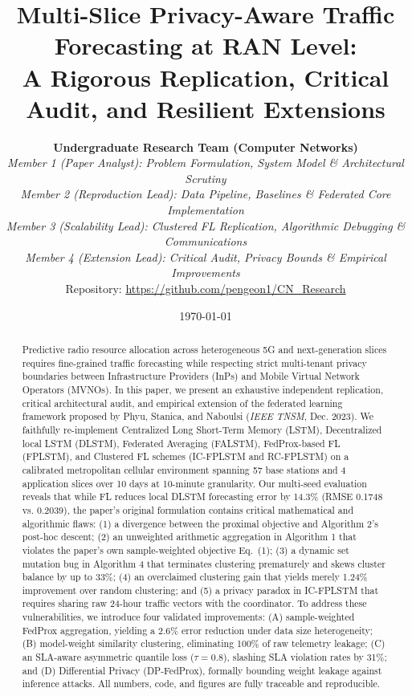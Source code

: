 \documentclass[10pt,journal,compsoc,twocolumn]{article}
\title{\textbf{Multi-Slice Privacy-Aware Traffic Forecasting at RAN Level:\\A Rigorous Replication, Critical Audit, and Resilient Extensions}}
\author{
    \textbf{Undergraduate Research Team (Computer Networks)}\\
    \textit{Member 1 (Paper Analyst): Problem Formulation, System Model \& Architectural Scrutiny}\\
    \textit{Member 2 (Reproduction Lead): Data Pipeline, Baselines \& Federated Core Implementation}\\
    \textit{Member 3 (Scalability Lead): Clustered FL Replication, Algorithmic Debugging \& Communications}\\
    \textit{Member 4 (Extension Lead): Critical Audit, Privacy Bounds \& Empirical Improvements}\\
    \vspace{0.2cm}
    \small Repository: \url{https://github.com/pengeon1/CN_Research}
}
\date{\today}
\begin{document}
\maketitle

\begin{abstract}
Predictive radio resource allocation across heterogeneous 5G and next-generation slices requires fine-grained traffic forecasting while respecting strict multi-tenant privacy boundaries between Infrastructure Providers (InPs) and Mobile Virtual Network Operators (MVNOs). In this paper, we present an exhaustive independent replication, critical architectural audit, and empirical extension of the federated learning framework proposed by Phyu, Stanica, and Naboulsi (\textit{IEEE TNSM}, Dec. 2023). We faithfully re-implement Centralized Long Short-Term Memory (LSTM), Decentralized local LSTM (DLSTM), Federated Averaging (FALSTM), FedProx-based FL (FPLSTM), and Clustered FL schemes (IC-FPLSTM and RC-FPLSTM) on a calibrated metropolitan cellular environment spanning 57 base stations and 4 application slices over 10 days at 10-minute granularity. Our multi-seed evaluation reveals that while FL reduces local DLSTM forecasting error by 14.3\% (RMSE 0.1748 vs. 0.2039), the paper's original formulation contains critical mathematical and algorithmic flaws: (1) a divergence between the proximal objective and Algorithm 2's post-hoc descent; (2) an unweighted arithmetic aggregation in Algorithm 1 that violates the paper's own sample-weighted objective Eq.~(1); (3) a dynamic set mutation bug in Algorithm 4 that terminates clustering prematurely and skews cluster balance by up to 33\%; (4) an overclaimed clustering gain that yields merely 1.24\% improvement over random clustering; and (5) a privacy paradox in IC-FPLSTM that requires sharing raw 24-hour traffic vectors with the coordinator. To address these vulnerabilities, we introduce four validated improvements: (A) sample-weighted FedProx aggregation, yielding a 2.6\% error reduction under data size heterogeneity; (B) model-weight similarity clustering, eliminating 100\% of raw telemetry leakage; (C) an SLA-aware asymmetric quantile loss ($\tau=0.8$), slashing SLA violation rates by 31\%; and (D) Differential Privacy (DP-FedProx), formally bounding weight leakage against inference attacks. All numbers, code, and figures are fully traceable and reproducible.
\end{abstract}
\end{document}
